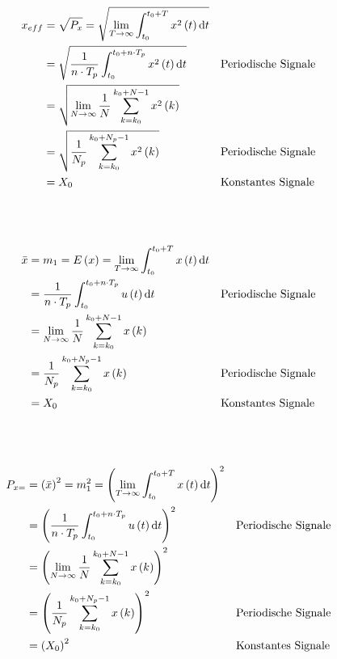 \begin{boxleft}
\end{boxleft}\begin{boxrightshaded}
\begin{align*}
x_{eff}&=\sqrt{P_x}=\sqrt{\lim_{T\to \infty}\int_{t_0}^{t_0+T} x^2\left(t\right)\mathop{}\!\mathrm{d} t}\\
&=\sqrt{\frac{1}{n\cdot T_p}\int_{t_0}^{t_0+n\cdot T_p} x^2\left(t\right)\mathop{}\!\mathrm{d} t}&&\text{Periodische Signale}\\
&=\sqrt{\lim_{N\to \infty}\frac{1}{N}\sum_{k=k_0}^{k_0+N-1}x^2\left(k\right)}\\
&=\sqrt{\frac{1}{N_p}\sum_{k=k_0}^{k_0+N_p-1}x^2\left(k\right)}&&\text{Periodische Signale}\\
&=X_0&&\text{Konstantes Signale}
\end{align*}
\end{boxrightshaded}


\begin{boxleft}
\\
\\
\end{boxleft}\begin{boxrightshaded}
\begin{align*}
\bar{x}&=m_1=E\left(x\right)=\lim_{T \to \infty}\int_{t_0}^{t_0+T}x\left(t\right) \mathop{}\!\mathrm{d} t\\
&=\frac{1}{n\cdot T_p}\int_{t_0}^{t_0+n\cdot T_p}u\left(t\right)\mathop{}\!\mathrm{d} t&&\text{Periodische Signale}\\
&=\lim_{N\to\infty}\frac{1}{N}\sum_{k=k_0}^{k_0+N-1}x\left(k\right)\\
&=\frac{1}{N_p}\sum_{k=k_0}^{k_0+N_p-1}x\left(k\right)&&\text{Periodische Signale}\\
&=X_0&&\text{Konstantes Signale}
\end{align*}
\end{boxrightshaded}


\begin{boxleft}
\\
\\
\end{boxleft}\begin{boxrightshaded}
\begin{align*}
P_{x=}&=\left(\bar{x}\right)^2=m_1^2=\left(\lim_{T \to \infty}\int_{t_0}^{t_0+T}x\left(t\right) \mathop{}\!\mathrm{d} t\right)^2\\
&=\left(\frac{1}{n\cdot T_p}\int_{t_0}^{t_0+n\cdot T_p}u\left(t\right)\mathop{}\!\mathrm{d} t\right)^2&&\text{Periodische Signale}\\
&=\left(\lim_{N\to\infty}\frac{1}{N}\sum_{k=k_0}^{k_0+N-1}x\left(k\right)\right)^2\\
&=\left(\frac{1}{N_p}\sum_{k=k_0}^{k_0+N_p-1}x\left(k\right)\right)^2&&\text{Periodische Signale}\\
&=\left(X_0\right)^2&&\text{Konstantes Signale}
\end{align*}
\end{boxrightshaded}


